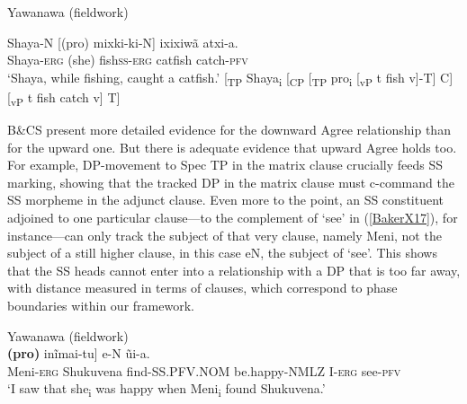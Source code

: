 \documentclass[output=paper,colorlinks,citecolor=brown,
]{langscibook}
\renewcommand{\sc}[1]{\textsc{#1}}
\begin{document}
\begin{exe}
    \ex Yawanawa (fieldwork) \label{BakerX16}
	    \begin{xlist}
			\ex \label{BakerX16a}
			\gll Shaya-N [(pro) mixki-ki-N] ixixiwã atxi-a.\\
			     Shaya-\sc{erg} (she) fish\sc{ss-erg} catfish catch-\sc{pfv}\\
			    \glt `Shaya, while fishing, caught a catfish.'
			\ex \label{BakerX16b}
			    [\textsubscript{TP }Shaya\textsubscript{i} [\textsubscript{CP }[\textsubscript{TP }pro\textsubscript{i} [\textsubscript{vP } t fish v]-T] C] [\textsubscript{vP } t fish catch v] T]
		\end{xlist}
\end{exe}
\vspace{14pt}
B\&CS present more detailed evidence for the downward Agree relationship than for the upward one. But there is adequate evidence that upward Agree holds too. For example, DP-movement to Spec TP in the matrix clause crucially feeds SS marking, showing that the tracked DP in the matrix clause must c-command the SS morpheme in the adjunct clause. Even more to the point, an SS constituent adjoined to one particular clause—to the complement of `see’ in (\ref{BakerX17}), for instance—can only track the subject of that very clause, namely Meni, not the subject of a still higher clause, in this case eN, the subject of `see’. This shows that the SS heads cannot enter into a relationship with a DP that is too far away, with distance measured in terms of clauses, which correspond to phase boundaries within our framework.

\begin{exe}
    \ex Yawanawa (fieldwork) \label{BakerX17}\\
        \gll [[Meni-N Shukuvena vetxi-\textbf{ashe}] \textbf{(pro)} inĩmai-tu] e-N ũi-a.\\
            Meni-\sc{erg} Shukuvena find-\sc{SS.PFV.NOM} be.happy-\sc{NMLZ} I-\sc{erg} see-\sc{pfv}\\
        \glt `I saw that she\textsubscript{i} was happy when Meni\textsubscript{i} found Shukuvena.'
\end{exe}
\end{document}
